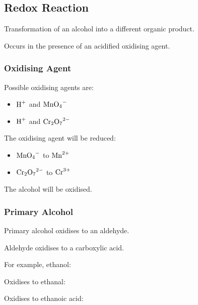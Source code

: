 \documentclass[a4paper,11pt]{article}
\begin{document}
\subsection{Redox Reaction}

Transformation of an alcohol into a different organic product.

Occurs in the presence of an acidified oxidising agent.


\subsubsection{Oxidising Agent}

Possible oxidising agents are:

\begin{itemize}
\item $\ce{H+}$ and $\ce{MnO4-}$
\item $\ce{H+}$ and $\ce{Cr2O7^2-}$
\end{itemize}

The oxidising agent will be reduced:

\begin{itemize}
\item $\ce{MnO4-}$ to $\ce{Mn^2+}$
\item $\ce{Cr2O7^2-}$ to $\ce{Cr^3+}$
\end{itemize}

The alcohol will be oxidised.


\subsubsection{Primary Alcohol}

Primary alcohol oxidises to an aldehyde.

Aldehyde oxidises to a carboxylic acid.

For example, ethanol:

\begin{center}
\end{center}

Oxidises to ethanal:

\begin{center}
\end{center}

Oxidises to ethanoic acid:

\begin{center}
\end{center}
\end{document}
